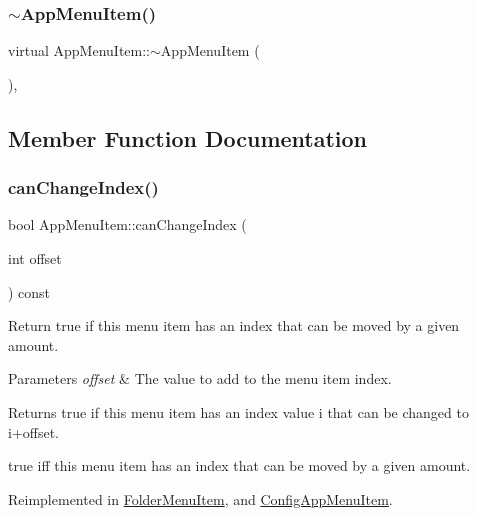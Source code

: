 \subsubsection{\texorpdfstring{$\sim$\+App\+Menu\+Item()}{~AppMenuItem()}}
{\footnotesize\ttfamily virtual App\+Menu\+Item\+::$\sim$\+App\+Menu\+Item (\begin{DoxyParamCaption}{ }\end{DoxyParamCaption})\hspace{0.3cm}{\ttfamily [inline]}, {\ttfamily [virtual]}}



\subsection{Member Function Documentation}
\mbox{\label{classAppMenuItem_a62de7cea03d96eecba40a533fdac6477}} 
\subsubsection{\texorpdfstring{can\+Change\+Index()}{canChangeIndex()}}
{\footnotesize\ttfamily bool App\+Menu\+Item\+::can\+Change\+Index (\begin{DoxyParamCaption}\item[{int}]{offset }\end{DoxyParamCaption}) const\hspace{0.3cm}{\ttfamily [virtual]}}

Return true if this menu item has an index that can be moved by a given amount.


\begin{DoxyParams}{Parameters}
{\em offset} & The value to add to the menu item index.\\
\hline
\end{DoxyParams}
\begin{DoxyReturn}{Returns}
true if this menu item has an index value i that can be changed to i+offset.

true iff this menu item has an index that can be moved by a given amount. 
\end{DoxyReturn}


Reimplemented in \mbox{\hyperlink{classFolderMenuItem_a61111b596d78f912bc1573c1ee1d356f}{Folder\+Menu\+Item}}, and \mbox{\hyperlink{classConfigAppMenuItem_a6a65535f73a82a093217843240ba7496}{Config\+App\+Menu\+Item}}.

